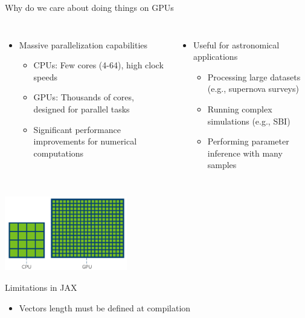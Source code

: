 \documentclass[aspectratio=169]{beamer}
\begin{document}
\begin{frame}{Why do we care about doing things on GPUs}
  \begin{columns}
    \begin{itemize}
      \item Massive parallelization capabilities
        \begin{itemize}
          \item CPUs: Few cores (4-64), high clock speeds
          \item GPUs: Thousands of cores, designed for parallel tasks
          \item Significant performance improvements for numerical computations
        \end{itemize}
    \end{itemize}
    
    \begin{itemize}
      \item Useful for astronomical applications
        \begin{itemize}
          \item Processing large datasets (e.g., supernova surveys)
          \item Running complex simulations (e.g., SBI)
          \item Performing parameter inference with many samples
        \end{itemize}
    \end{itemize}
  \end{columns}
  
  \begin{center}
    \includegraphics[width=0.4\textwidth]{images/cpuvgpu.png}
  \end{center}
\end{frame}

\begin{frame}{Limitations in JAX}
  \begin{itemize}
    \item Vectors length must be defined at compilation
  \end{itemize}
\end{frame}
\end{document}
